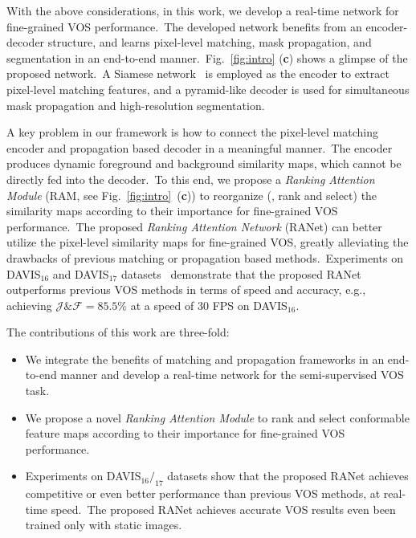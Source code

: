 \documentclass[10pt,twocolumn,letterpaper]{article}
\begin{document}
With the above considerations, in this work, we develop a real-time network for fine-grained VOS performance.\ The developed network benefits from an encoder-decoder structure, and learns pixel-level matching, mask propagation, and segmentation in an end-to-end manner.\ Fig.~\ref{fig:intro} (\textbf{c}) shows a glimpse of the proposed network.\ A Siamese network~\cite{siamfc} is employed as the encoder to extract pixel-level matching features, and a pyramid-like decoder is used for simultaneous mask propagation and high-resolution segmentation.\ 
 


A key problem in our framework is how to connect the pixel-level matching encoder and propagation based decoder in a meaningful manner.\ The encoder produces dynamic foreground and background similarity maps, which cannot be directly fed into the decoder.\
To this end, we propose a \emph{Ranking Attention Module} (RAM, see Fig.~\ref{fig:intro}\ (\textbf{c})) to reorganize (\ie, rank and select) the similarity maps according to their importance for fine-grained VOS performance.\ The proposed \emph{Ranking Attention Network} (RANet) can better utilize the pixel-level similarity maps for fine-grained VOS, greatly alleviating the drawbacks of previous matching or propagation based methods.\ Experiments on DAVIS$_{16}$ and DAVIS$_{17}$ datasets~\cite{davis2016,davis2017} demonstrate that the proposed RANet outperforms previous VOS methods in terms of speed and accuracy, e.g., achieving $\mathcal{J}\&\mathcal{F}=85.5\%$ at a speed of $30$ FPS on DAVIS$_{16}$.


The contributions of this work are three-fold: 
\vspace{-2mm}
\begin{itemize}
\item
We integrate the benefits of matching and propagation frameworks in an end-to-end manner and develop a real-time network for the semi-supervised VOS task. 
\vspace{-3mm}
\item 
\vspace{-3mm}
We propose a novel \emph{Ranking Attention Module} to rank and select conformable feature maps according to their importance for fine-grained VOS performance.
\vspace{-2mm}
\item 
Experiments on DAVIS$_{16}/_{17}$ datasets show that the proposed RANet achieves competitive or even better performance than previous VOS methods, at real-time speed.\ The proposed RANet achieves accurate VOS results even been trained only with static images.
\end{itemize}
\vspace{-4mm}
\end{document}
